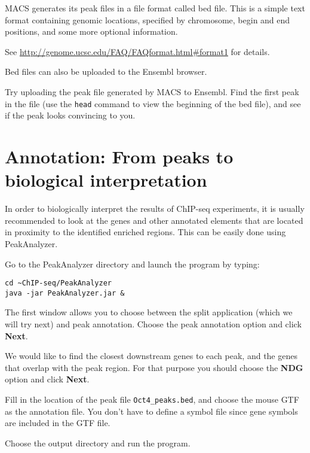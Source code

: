 \begin{note}
MACS generates its peak files in a file format called bed file. This is a simple
text format containing genomic locations, specified by chromosome, begin and end
positions, and some more optional information.

See \url{http://genome.ucsc.edu/FAQ/FAQformat.html#format1} for details.

Bed files can also be uploaded to the Ensembl browser.
\end{note}

\begin{advanced}
Try uploading the peak file generated by MACS to Ensembl. Find the first peak in
the file (use the \texttt{head} command to view the beginning of the bed file), and see
if the peak looks convincing to you.
\end{advanced}


\section{Annotation: From peaks to biological interpretation}

\begin{information}
In order to biologically interpret the results of ChIP-seq experiments, it is
usually recommended to look at the genes and other annotated elements that are
located in proximity to the identified enriched regions. This can be easily done
using PeakAnalyzer.
\end{information}

\begin{steps}
Go to the PeakAnalyzer directory and launch the program by typing:
\begin{lstlisting}
cd ~ChIP-seq/PeakAnalyzer
java -jar PeakAnalyzer.jar &
\end{lstlisting}

The first window allows you to choose between the split application (which we
will try next) and peak annotation. Choose the peak annotation option and click
\textbf{Next}.

We would like to find the closest downstream genes to each peak, and the genes
that overlap with the peak region. For that purpose you should choose the
\textbf{NDG} option and click \textbf{Next}.

Fill in the location of the peak file \texttt{Oct4\_peaks.bed}, and choose the mouse GTF
as the annotation file. You don't have to define a symbol file since gene
symbols are included in the GTF file.

Choose the output directory and run the program.
\end{steps}

